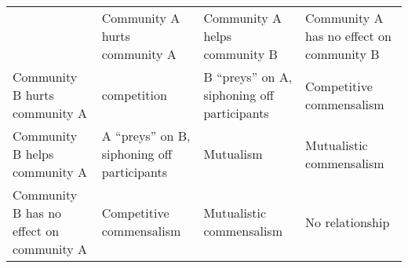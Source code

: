 
\Small
  \begin{tabular}{*{4}{m{}}}
    \hline
    & Community A hurts \newline community A & Community A helps community B  & Community A has no effect on community B \\
    Community B hurts \newline community A & competition & B ``preys'' on A, siphoning off participants & Competitive \newline commensalism \\
    Community B helps \newline  community A & A ``preys'' on B, siphoning off participants  & Mutualism & Mutualistic \newline commensalism \\
    Community B  has no effect on community A & Competitive \newline commensalism &  Mutualistic \newline commensalism & No relationship \\ \hline
\end{tabular}



